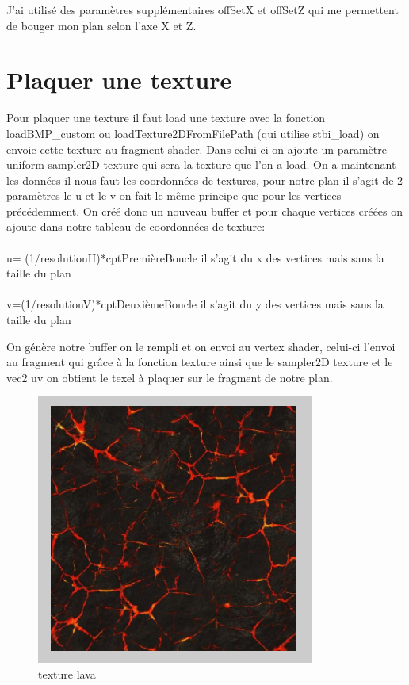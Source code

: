\documentclass{article}
\begin{document}
J'ai utilisé des paramètres supplémentaires offSetX et offSetZ qui me permettent de bouger mon plan selon l'axe X et Z.

\newpage
\section{Plaquer une texture}
Pour plaquer une texture  il faut load une texture avec la fonction loadBMP\_custom ou loadTexture2DFromFilePath (qui utilise stbi\_load) on envoie cette texture au fragment shader. Dans celui-ci on ajoute un paramètre uniform sampler2D texture qui sera la texture que l'on a load.
On a maintenant les données il nous faut les coordonnées de textures, pour notre plan il s'agit de 2 paramètres le u et le v on fait le même principe que pour les vertices précédemment. On créé donc un nouveau buffer et pour chaque vertices créées on ajoute dans notre tableau de coordonnées de texture: 
\\\\
u= (1/resolutionH)*cptPremièreBoucle il s'agit du x des vertices mais sans la taille du plan
\\\\
v=(1/resolutionV)*cptDeuxièmeBoucle il s'agit du y des vertices mais sans la taille du plan

On génère notre buffer on le rempli et on envoi au vertex shader, celui-ci l'envoi au fragment qui grâce à la fonction texture ainsi que le sampler2D texture et le vec2 uv on obtient le texel à plaquer sur le fragment de notre plan.

\begin{figure}[h!]
\centerline{ \includegraphics[scale=0.5]{./rendus/text.png} }
\caption{texture lava} 
\end{figure}
\end{document}
